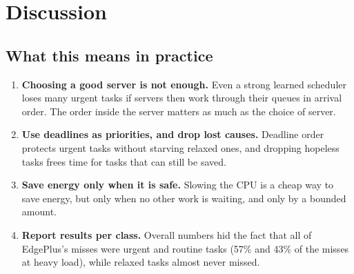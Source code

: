 \documentclass[11pt]{article}
\theoremstyle{definition}
\begin{document}
\section{Discussion}
\label{sec:discussion}

\subsection{What this means in practice}
\begin{enumerate}
\item \textbf{Choosing a good server is not enough.} Even a strong learned scheduler loses many urgent tasks if
servers then work through their queues in arrival order. The order inside the server matters as much as the
choice of server.
\item \textbf{Use deadlines as priorities, and drop lost causes.} Deadline order protects urgent tasks without
starving relaxed ones, and dropping hopeless tasks frees time for tasks that can still be saved.
\item \textbf{Save energy only when it is safe.} Slowing the CPU is a cheap way to save energy, but only when no
other work is waiting, and only by a bounded amount.
\item \textbf{Report results per class.} Overall numbers hid the fact that all of EdgePlus's misses were urgent and
routine tasks (57\% and 43\% of the misses at heavy load), while relaxed tasks almost never missed.
\end{enumerate}
\end{document}
